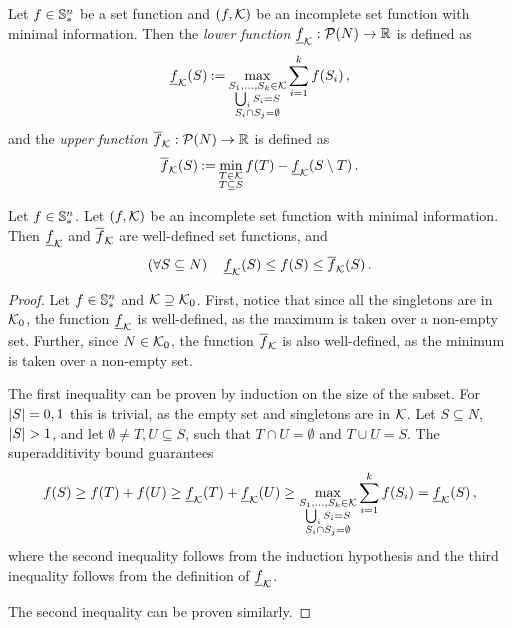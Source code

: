 \begin{defi}
  Let $ f \in \mathbb{S}^n_* $ be a set function and $ \left( f, \mathcal{K} \right) $ be an incomplete set function with minimal information.
  Then the \emph{lower function} $ \underline{f}_{\mathcal{K}}: \mathcal{P}\!\left(N\right) \to \mathbb{R} $ is defined as \[
    \underline{f}_{\mathcal{K}}\!\left(S\right) \mathbin{:=} \max_{\substack{S_1, \dots, S_k \in \mathcal{K} \\ \bigcup_i S_i = S \\ S_i \cap S_j = \emptyset}} \sum_{i=1}^k f\!\left(S_i\right),
  \]
  and the \emph{upper function} $ \overline{f}_{\mathcal{K}}: \mathcal{P}\!\left(N\right) \to \mathbb{R} $ is defined as \[
    \overline{f}_{\mathcal{K}}\!\left(S\right) \mathbin{:=} \min_{\substack{T \in \mathcal{K} \\ T \subseteq S}} f\!\left(T\right) - \underline{f}_{\mathcal{K}}\!\left(S \setminus T\right).
  \]
\end{defi}

\begin{prop}[ ]
  Let $ f \in \mathbb{S}^n_* $.
  Let $ \left( f, \mathcal{K} \right) $ be an incomplete set function with minimal information.
  Then $ \underline{f}_{\mathcal{K}} $ and $ \overline{f}_{\mathcal{K}} $ are well-defined set functions, and \[
    \left( \forall S \subseteq N \right)\quad \underline{f}_{\mathcal{K}}\!\left(S\right) \leq f\!\left(S\right) \leq \overline{f}_{\mathcal{K}}\!\left(S\right).
  \]
\end{prop}

\begin{proof}
  Let $ f \in \mathbb{S}^n_* $ and $ \mathcal{K} \supseteq \mathcal{K}_0 $.
  First, notice that since all the singletons are in $ \mathcal{K}_0 $, the function $ \underline{f}_{\mathcal{K}} $ is well-defined, as the maximum is taken over a non-empty set.
  Further, since $ N \in \mathcal{K}_0 $, the function $ \overline{f}_{\mathcal{K}} $ is also well-defined, as the minimum is taken over a non-empty set.

  The first inequality can be proven by induction on the size of the subset.
  For $ \left\lvert S \right\rvert = 0,1 $ this is trivial, as the empty set and singletons are in $ \mathcal{K} $.
  Let $ S \subseteq N $, $ \left\lvert S \right\rvert > 1 $, and let $ \emptyset \neq T,U \subseteq S $, such that $ T \cap U = \emptyset $ and $ T \cup U = S $.
  The superadditivity bound guarantees \[
		f\!\left(S\right) \geq f\!\left(T\right) + f\!\left(U\right) \geq \underline{f}_{\mathcal{K}}\!\left(T\right) + \underline{f}_{\mathcal{K}}\!\left(U\right) \geq \max_{\substack{S_1, \dots, S_k \in \mathcal{K} \\ \bigcup_i S_i = S \\ S_i \cap S_j = \emptyset}} \sum_{i=1}^k f\!\left(S_i\right) = \underline{f}_{\mathcal{K}}\!\left(S\right),
  \]
  where the second inequality follows from the induction hypothesis and the third inequality follows from the definition of $ \underline{f}_{\mathcal{K}} $.

  The second inequality can be proven similarly.
\end{proof}

